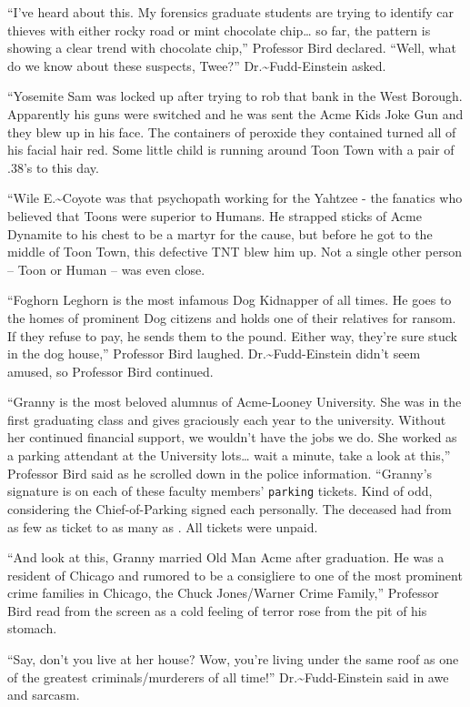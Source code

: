 \documentclass[captions=tableheading]{scrbook}
\begin{document}
“I’ve heard about this. My forensics graduate students are trying to identify car thieves with either rocky road or mint chocolate chip… so far, the pattern is showing a clear trend with chocolate chip,” Professor Bird declared. 
“Well, what do we know about these suspects, Twee?” Dr.\~{}Fudd-Einstein asked.

“Yosemite Sam was locked up after trying to rob that bank in the West Borough. Apparently his guns were switched and he was sent the Acme Kids Joke Gun and they blew up in his face. The containers of peroxide they contained turned all of his facial hair red. Some little child is running around Toon Town with a pair of .38’s to this day. 

“Wile E.\~{}Coyote was that psychopath working for the Yahtzee - the fanatics who believed that Toons were superior to Humans. He strapped sticks of Acme Dynamite to his chest to be a martyr for the cause, but before he got to the middle of Toon Town, this defective TNT blew him up. Not a single other person -- Toon or Human -- was even close.

“Foghorn Leghorn is the most infamous Dog Kidnapper of all times. He goes to the homes of prominent Dog citizens and holds one of their relatives for ransom. If they refuse to pay, he sends them to the pound. Either way, they’re sure stuck in the dog house,” Professor Bird laughed. Dr.\~{}Fudd-Einstein didn’t seem amused, so Professor Bird continued. 

“Granny is the most beloved alumnus of Acme-Looney University. She was in the first graduating class and gives graciously each year to the university. Without her continued financial support, we wouldn’t have the jobs we do. She worked as a parking attendant at the University lots\ldots{} wait a minute, take a look at this,” Professor Bird said as he scrolled down in the police information. “Granny’s signature is on each of these faculty members’ \texttt{parking} tickets. Kind of odd, considering the Chief-of-Parking signed each personally. The deceased had from as few as 
 ticket to as many as 
. All tickets were unpaid.

“And look at this, Granny married Old Man Acme after graduation. He was a resident of Chicago and rumored to be a consigliere to one of the most prominent crime families in Chicago, the Chuck Jones/Warner Crime Family,” Professor Bird read from the screen as a cold feeling of terror rose from the pit of his stomach. 

“Say, don’t you live at her house? Wow, you’re living under the same roof as one of the greatest criminals/murderers of all time!” Dr.\~{}Fudd-Einstein said in awe and sarcasm.
\end{document}
